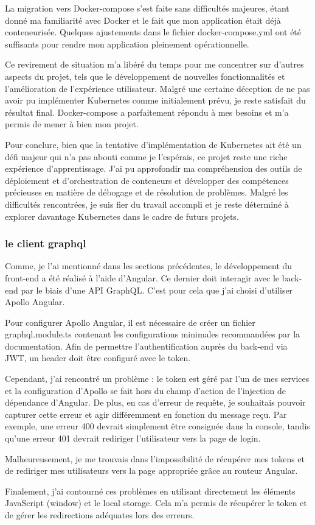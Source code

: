 La migration vers Docker-compose s'est faite sans difficultés majeures, étant donné ma familiarité avec Docker et le fait que mon application était déjà conteneurisée.
Quelques ajustements dans le fichier docker-compose.yml ont été suffisants pour rendre mon application pleinement opérationnelle.

Ce revirement de situation m'a libéré du temps pour me concentrer sur d'autres aspects du projet,
tels que le développement de nouvelles fonctionnalités et l'amélioration de l'expérience utilisateur.
Malgré une certaine déception de ne pas avoir pu implémenter Kubernetes comme initialement prévu, je reste satisfait du résultat final.
Docker-compose a parfaitement répondu à mes besoins et m'a permis de mener à bien mon projet.

Pour conclure, bien que la tentative d'implémentation de Kubernetes ait été un défi majeur qui n'a pas abouti comme je l'espérais,
ce projet reste une riche expérience d'apprentissage.
J'ai pu approfondir ma compréhension des outils de déploiement et d'orchestration de conteneurs et développer des compétences précieuses en matière de débogage et de résolution de problèmes.
Malgré les difficultés rencontrées, je suis fier du travail accompli et je reste déterminé à explorer davantage Kubernetes dans le cadre de futurs projets.

\subsubsection{le client graphql}

Comme, je l'ai mentionné dans les sections précédentes, le développement du front-end a été réalisé à l'aide d'Angular.
Ce dernier doit interagir avec le back-end par le biais d'une API GraphQL. C'est pour cela que j'ai choisi d'utiliser Apollo Angular.

Pour configurer Apollo Angular, il est nécessaire de créer un fichier graphql.module.ts contenant les configurations minimales recommandées par la documentation.
Afin de permettre l'authentification auprès du back-end via JWT, un header doit être configuré avec le token.

Cependant, j'ai rencontré un problème : le token est géré par l'un de mes services et la configuration d'Apollo se fait hors du champ d'action de l'injection de dépendance d'Angular.
De plus, en cas d'erreur de requête, je souhaitais pouvoir capturer cette erreur et agir différemment en fonction du message reçu.
Par exemple, une erreur 400 devrait simplement être consignée dans la console, tandis qu'une erreur 401 devrait rediriger l'utilisateur vers la page de login.

Malheureusement, je me trouvais dans l'impossibilité de récupérer mes tokens et de rediriger mes utilisateurs vers la page appropriée grâce au routeur Angular.

Finalement, j'ai contourné ces problèmes en utilisant directement les éléments JavaScript (window) et le local storage.
Cela m'a permis de récupérer le token et de gérer les redirections adéquates lors des erreurs.
